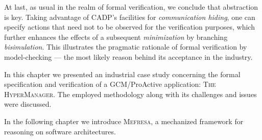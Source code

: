     	At last, as usual in the
	realm of formal verification, we conclude that abstraction is key. Taking advantage of
	CADP's facilities for \textit{communication hiding}, one can specify 
	actions that need not to be observed for the verification purposes, which
	further enhances the effects of a subsequent \textit{minimization} by branching \textit{bisimulation}.
	This illustrates the pragmatic rationale of formal verification by model-checking --- the
	most likely reason behind its acceptance in the industry.
	

\chapbreak

			In this chapter we presented an industrial case study concerning the formal specification and verification of
		a \ac{GCM}/ProActive application: \textsc{The HyperManager}. The employed methodology along with its challenges
		and issues were discussed.
	
			In the following chapter we introduce \textsc{Mefresa}, a mechanized framework for reasoning on software architectures.
			
	
	
	
